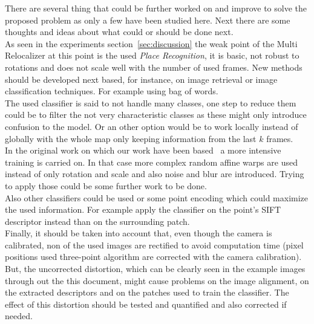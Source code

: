 There are several thing that could be further worked on and improve to solve the proposed problem as only a few have been studied here. Next there are some thoughts and ideas about what could or should be done next.\\

As seen in the experiments section~\ref{sec:discussion} the weak point of the Multi Relocalizer at this point is the used \textit{Place Recognition}, it is basic, not robust to rotations and does not scale well with the number of used frames. New methods should be developed next based, for instance, on image retrieval or image classification techniques. For example using bag of words. \\

The used classifier is said to not handle many classes, one step to reduce them could  be to filter  the not very characteristic classes as these might only introduce confusion to the model. Or an other option would be to work locally instead of globally with the whole map only keeping information from the last $k$ frames.\\

In the original work on which our work have been based~\cite{Ozuysal2010} a more intensive training is carried on. In that case more complex random affine warps are used instead of only rotation and scale and also noise and blur are introduced. Trying to apply those could be some further work to be done.\\

Also other classifiers could be used or some point encoding which could maximize the used information. For example apply the classifier on the point's SIFT descriptor instead than on the surrounding patch.\\

Finally, it should be taken into account that, even though the camera is calibrated, non of the used images are rectified to avoid computation time (pixel positions used three-point algorithm are corrected with the camera calibration). But, the uncorrected distortion, which can be clearly seen in the example images through out the this document, might cause problems on the image alignment, on the extracted descriptors and on the patches used to train the classifier. The effect of this distortion should be tested and quantified and also corrected if needed.\\


